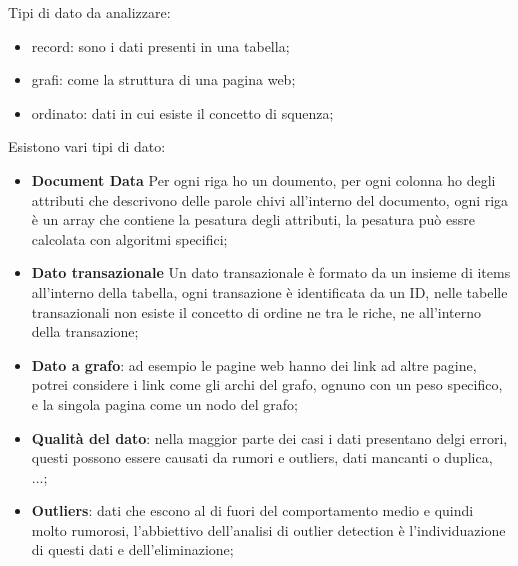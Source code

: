 \documentclass[12pt]{article}
\begin{document}
Tipi di dato da analizzare:
\begin{itemize}
    \item record: sono i dati presenti in una tabella;
    \item grafi: come la struttura di una pagina web;
    \item ordinato: dati in cui esiste il concetto di squenza;
\end{itemize}

Esistono vari tipi di dato:
\begin{itemize}
    \item \textbf{Document Data} Per ogni riga ho un doumento, per ogni colonna ho degli attributi che descrivono delle parole chivi all'interno del documento, ogni riga \`e un array che contiene la pesatura degli attributi, la pesatura pu\`o essre calcolata con algoritmi specifici;
    \item \textbf{Dato transazionale} Un dato transazionale \`e formato da un insieme di items all'interno della tabella, ogni transazione \`e identificata da un ID, nelle tabelle transazionali non esiste il concetto di ordine ne tra le riche, ne all'interno della transazione;
    \item \textbf{Dato a grafo}: ad esempio le pagine web hanno dei link ad altre pagine, potrei considere i link come gli archi del grafo, ognuno con un peso specifico, e la singola pagina come un nodo del grafo;
    \item \textbf{Qualit\`a del dato}: nella maggior parte dei casi i dati presentano delgi errori, questi possono essere causati da rumori e outliers, dati mancanti o duplica, ...;
    \item \textbf{Outliers}: dati che escono al di fuori del comportamento medio e quindi molto rumorosi, l'abbiettivo dell'analisi di outlier detection \`e l'individuazione di questi dati e dell'eliminazione;
\end{itemize}
\end{document}
